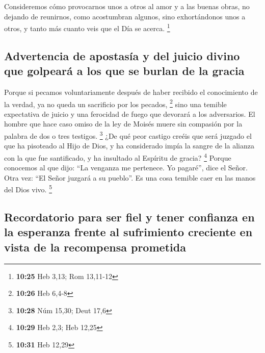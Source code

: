 \begin{paracol}{2}
 Consideremos cómo provocarnos unos a otros al amor y a
las buenas obras,  no dejando de reunirnos, como
acostumbran algunos, sino exhortándonos unos a otros, y tanto más cuanto
veis que el Día se acerca. \footnote{\textbf{10:25} Heb 3,13; Rom
  13,11-12}

\hypertarget{advertencia-de-apostasuxeda-y-del-juicio-divino-que-golpearuxe1-a-los-que-se-burlan-de-la-gracia}{%
\subsection{Advertencia de apostasía y del juicio divino que golpeará a
los que se burlan de la
gracia}\label{advertencia-de-apostasuxeda-y-del-juicio-divino-que-golpearuxe1-a-los-que-se-burlan-de-la-gracia}}

 Porque si pecamos voluntariamente después de haber
recibido el conocimiento de la verdad, ya no queda un sacrificio por los
pecados, \footnote{\textbf{10:26} Heb 6,4-8}  sino una
temible expectativa de juicio y una ferocidad de fuego que devorará a
los adversarios.  El hombre que hace caso omiso de la ley
de Moisés muere sin compasión por la palabra de dos o tres testigos.
\footnote{\textbf{10:28} Núm 15,30; Deut 17,6}  ¿De qué
peor castigo creéis que será juzgado el que ha pisoteado al Hijo de
Dios, y ha considerado impía la sangre de la alianza con la que fue
santificado, y ha insultado al Espíritu de gracia? \footnote{\textbf{10:29}
  Heb 2,3; Heb 12,25}  Porque conocemos al que dijo: ``La
venganza me pertenece. Yo pagaré'', dice el Señor. Otra vez: ``El Señor
juzgará a su pueblo''.  Es una cosa temible caer en las
manos del Dios vivo. \footnote{\textbf{10:31} Heb 12,29}

\hypertarget{recordatorio-para-ser-fiel-y-tener-confianza-en-la-esperanza-frente-al-sufrimiento-creciente-en-vista-de-la-recompensa-prometida}{%
\subsection{Recordatorio para ser fiel y tener confianza en la esperanza
frente al sufrimiento creciente en vista de la recompensa
prometida}\label{recordatorio-para-ser-fiel-y-tener-confianza-en-la-esperanza-frente-al-sufrimiento-creciente-en-vista-de-la-recompensa-prometida}}


\end{paracol}
